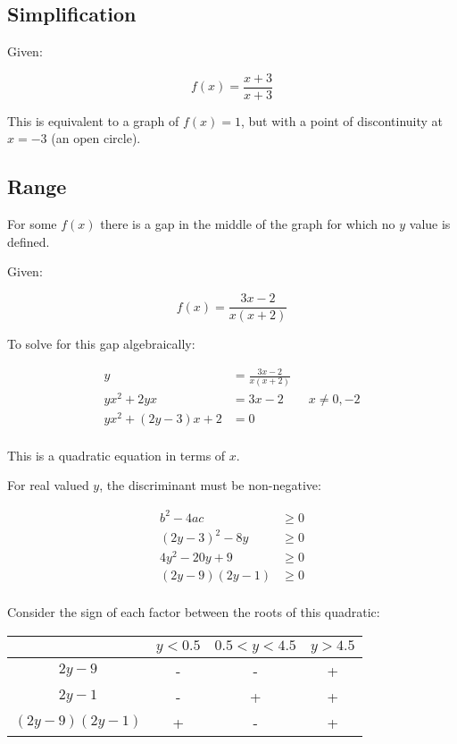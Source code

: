 \documentclass[a4paper,11pt]{article}
\begin{document}
\subsection{Simplification}

Given:

$$
f(x) = \frac{x + 3}{x + 3}
$$

This is equivalent to a graph of $f(x) = 1$, but with a point of discontinuity
at $x = -3$ (an open circle).


\subsection{Range}

For some $f(x)$ there is a gap in the middle of the graph for which no $y$ value
is defined.

Given:

$$
f(x) = \frac{3x - 2}{x(x + 2)}
$$

To solve for this gap algebraically:

$$
\begin{aligned}
y & = \frac{3x - 2}{x(x + 2)} \\
yx^2 + 2yx & = 3x - 2 \qquad x \neq 0, -2 \\
yx^2 + (2y - 3)x + 2 & = 0 \\
\end{aligned}
$$

This is a quadratic equation in terms of $x$.

For real valued $y$, the discriminant must be non-negative:

$$
\begin{aligned}
b^2 - 4ac & \geq 0 \\
(2y - 3)^2 - 8y & \geq 0 \\
4y^2 - 20y + 9 & \geq 0 \\
(2y - 9)(2y - 1) & \geq 0 \\
\end{aligned}
$$

Consider the sign of each factor between the roots of this quadratic:

\begin{center}
\begin{tabular}{c|c|c|c}
& $y < 0.5$ & $0.5 < y < 4.5$ & $y > 4.5$ \\
\hline
$2y - 9$ & - & - & + \\
$2y - 1$ & - & + & + \\
$(2y - 9)(2y - 1)$ & + & - & + \\
\end{tabular}
\end{center}
\end{document}
